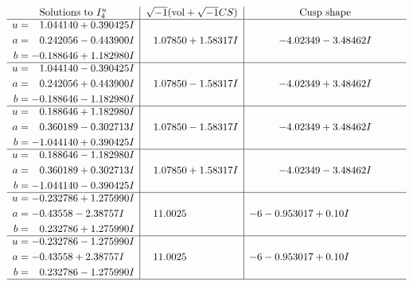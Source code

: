 \documentclass[1p]{elsarticle_modified}
\theoremstyle{definition}
\newcommand{\I}{\sqrt{-1}}
\begin{document}
$$\begin{array}{c|c|c}  
\text{Solutions to }I^u_{4}& \I (\text{vol} + \sqrt{-1}CS) & \text{Cusp shape}\\
 \hline 
\begin{aligned}
u &= \phantom{-}1.044140 + 0.390425 I \\
a &= \phantom{-}0.242056 - 0.443900 I \\
b &= -0.188646 + 1.182980 I\end{aligned}
 & \phantom{-}1.07850 + 1.58317 I & -4.02349 - 3.48462 I \\ \hline\begin{aligned}
u &= \phantom{-}1.044140 - 0.390425 I \\
a &= \phantom{-}0.242056 + 0.443900 I \\
b &= -0.188646 - 1.182980 I\end{aligned}
 & \phantom{-}1.07850 - 1.58317 I & -4.02349 + 3.48462 I \\ \hline\begin{aligned}
u &= \phantom{-}0.188646 + 1.182980 I \\
a &= \phantom{-}0.360189 - 0.302713 I \\
b &= -1.044140 + 0.390425 I\end{aligned}
 & \phantom{-}1.07850 - 1.58317 I & -4.02349 + 3.48462 I \\ \hline\begin{aligned}
u &= \phantom{-}0.188646 - 1.182980 I \\
a &= \phantom{-}0.360189 + 0.302713 I \\
b &= -1.044140 - 0.390425 I\end{aligned}
 & \phantom{-}1.07850 + 1.58317 I & -4.02349 - 3.48462 I \\ \hline\begin{aligned}
u &= -0.232786 + 1.275990 I \\
a &= -0.43558 - 2.38757 I \\
b &= \phantom{-}0.232786 + 1.275990 I\end{aligned}
 & \phantom{-}11.0025\phantom{ +0.000000I} &                  -6
-0.953017 + 0. 10   I\phantom{ +0.000000I} \\ \hline\begin{aligned}
u &= -0.232786 - 1.275990 I \\
a &= -0.43558 + 2.38757 I \\
b &= \phantom{-}0.232786 - 1.275990 I\end{aligned}
 & \phantom{-}11.0025\phantom{ +0.000000I} &                  -6
-0.953017 + 0. 10   I\phantom{ +0.000000I}\\
 \hline 
 \end{array}$$\newpage
\end{document}
